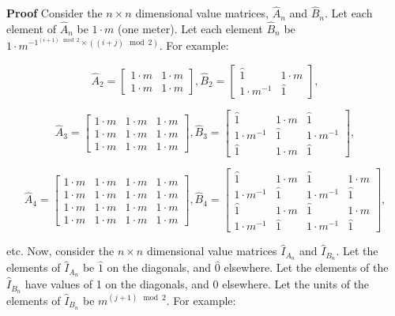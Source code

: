 \documentclass[10pt,letterpaper]{article}
\newenvironment{proof}{\noindent\textbf{Proof} }{\qed \newline}
\newcommand{\qed}{\nobreak \ifvmode \relax \else
      \ifdim\lastskip<1.5em \hskip-\lastskip
      \hskip1.5em plus0em minus0.5em \fi \nobreak
      \vrule height0.75em width0.5em depth0.25em\fi}
\numberwithin{equation}{section}
\begin{document}
\begin{proof}Consider the $n \times n$ dimensional value matrices, $\hat A_n$ and $\hat B_n$.  Let each element of $\hat A_n$ be $1 \cdot m$ (one meter).  Let each element $\hat B_n$ be $1 \cdot m^{-1^{(i + 1) \mod 2} \times ((i + j) \mod 2)}$.  For example:
 
\[ \hat A_2 = \left[ \begin{matrix} 
  1 \cdot m & 1 \cdot m \\
  1 \cdot m & 1 \cdot m
 \end{matrix} \right],
 \hat B_2 = \left[ \begin{matrix} 
  \hat 1 & 1 \cdot m \\
  1 \cdot m^{-1} & \hat 1
 \end{matrix} \right], \]

\[ \hat A_3 = \left[ \begin{matrix} 
  1 \cdot m & 1 \cdot m & 1 \cdot m \\
  1 \cdot m & 1 \cdot m & 1 \cdot m \\
  1 \cdot m & 1 \cdot m & 1 \cdot m
 \end{matrix} \right],
 \hat B_3 = \left[ \begin{matrix} 
  \hat 1 & 1 \cdot m & \hat 1 \\
  1 \cdot m^{-1} & \hat 1 & 1 \cdot m^{-1} \\
  \hat 1 & 1 \cdot m & \hat 1
 \end{matrix} \right], \]

\[ \hat A_4 = \left[ \begin{matrix} 
  1 \cdot m & 1 \cdot m & 1 \cdot m & 1 \cdot m \\
  1 \cdot m & 1 \cdot m & 1 \cdot m & 1 \cdot m \\
  1 \cdot m & 1 \cdot m & 1 \cdot m & 1 \cdot m \\
  1 \cdot m & 1 \cdot m & 1 \cdot m & 1 \cdot m
 \end{matrix} \right],
 \hat B_4 = \left[ \begin{matrix} 
  \hat 1 & 1 \cdot m & \hat 1 & 1 \cdot m \\
  1 \cdot m^{-1} & \hat 1 & 1 \cdot m^{-1} & \hat 1 \\
  \hat 1 & 1 \cdot m & \hat 1 & 1 \cdot m \\
  1 \cdot m^{-1} & \hat 1 & 1 \cdot m^{-1} & \hat 1
 \end{matrix} \right], \]

etc.  Now, consider the $n \times n$ dimensional value matrices $\hat I_{A_n}$ and $\hat I_{B_n}$.  Let the elements of $\hat I_{A_n}$ be $\hat 1$ on the diagonals, and $\hat 0$ elsewhere.  Let the elements of the $\hat I_{B_n}$ have values of 1 on the diagonals, and 0 elsewhere.  Let the units of the elements of $\hat I_{B_n}$ be $m^{(j + 1) \mod 2}$.  For example:


\end{proof}
\end{document}
